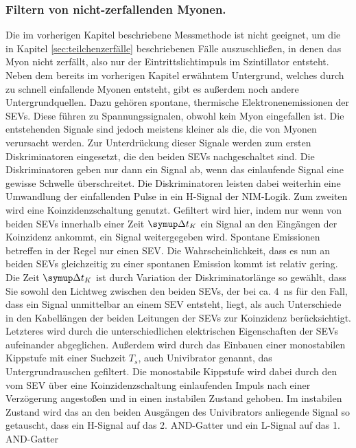 \documentclass[
  bibliography=totoc,     %
  captions=tableheading,  %
  titlepage=firstiscover, %
]{scrartcl}
\begin{document}
  \subsubsection{Filtern von nicht-zerfallenden Myonen.}
  Die im vorherigen Kapitel beschriebene Messmethode ist nicht geeignet, um die in Kapitel
  \ref{sec:teilchenzerfälle} beschriebenen Fälle auszuschließen, in denen das Myon
  nicht zerfällt, also nur der Eintrittslichtimpuls im Szintillator entsteht.
  Neben dem bereits im vorherigen Kapitel erwähntem Untergrund, welches durch zu
  schnell einfallende Myonen entsteht, gibt es außerdem noch andere Untergrundquellen.
  Dazu gehören spontane, thermische Elektronenemissionen
  der SEVs. Diese führen zu Spannungssignalen, obwohl kein Myon eingefallen ist.
  Die entstehenden Signale sind jedoch meistens kleiner als die, die von Myonen verursacht werden.
  Zur Unterdrückung dieser Signale werden zum ersten Diskriminatoren eingesetzt, die
  den beiden SEVs nachgeschaltet sind. Die Diskriminatoren geben nur dann ein Signal
  ab, wenn das einlaufende Signal eine gewisse Schwelle überschreitet. Die
  Diskriminatoren leisten dabei weiterhin eine Umwandlung der einfallenden Pulse
  in ein H-Signal der NIM-Logik.
  Zum zweiten wird eine Koinzidenzschaltung genutzt. Gefiltert wird hier, indem nur
  wenn von beiden SEVs innerhalb einer Zeit $\symup\Delta t_K$
  ein Signal an den Eingängen der Koinzidenz ankommt, ein Signal weitergegeben wird.
  Spontane Emissionen betreffen in der Regel nur einen SEV. Die Wahrscheinlichkeit,
  dass es nun an beiden SEVs gleichzeitig zu einer spontanen Emission kommt ist relativ gering.
  Die Zeit $\symup\Delta t_K$
  ist durch Variation der Diskriminatorlänge so gewählt, dass Sie sowohl den Lichtweg zwischen den beiden SEVs,
  der bei ca. \SI{4}{\nano\second} für den Fall, dass ein Signal unmittelbar an einem SEV
  entsteht, liegt, als auch Unterschiede in den Kabellängen der beiden Leitungen der
  SEVs zur Koinzidenz berücksichtigt. Letzteres wird durch die unterschiedlichen
  elektrischen Eigenschaften der SEVs aufeinander abgeglichen. Außerdem wird durch das
  Einbauen einer monostabilen Kippstufe mit einer Suchzeit $T_s$, auch Univibrator genannt, das Untergrundrauschen gefiltert. Die
  monostabile Kippstufe wird dabei durch den vom SEV über eine Koinzidenzschaltung einlaufenden
  Impuls nach einer Verzögerung angestoßen und in einen instabilen Zustand gehoben.
  Im instabilen Zustand wird das an den beiden Ausgängen des Univibrators anliegende Signal so
  getauscht, dass ein H-Signal auf das 2. AND-Gatter und ein L-Signal auf das 1. AND-Gatter
\end{document}
